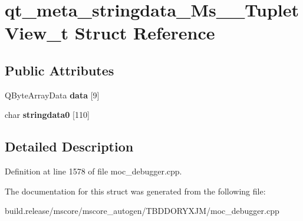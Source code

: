 \hypertarget{structqt__meta__stringdata___ms_____tuplet_view__t}{}\section{qt\+\_\+meta\+\_\+stringdata\+\_\+\+Ms\+\_\+\+\_\+\+Tuplet\+View\+\_\+t Struct Reference}
\label{structqt__meta__stringdata___ms_____tuplet_view__t}
\subsection*{Public Attributes}
\begin{DoxyCompactItemize}
\item 
\mbox{\label{structqt__meta__stringdata___ms_____tuplet_view__t_a9fe8747e81ca511d2bd26a7d454acd7c}} 
Q\+Byte\+Array\+Data {\bfseries data} \mbox{[}9\mbox{]}
\item 
\mbox{\label{structqt__meta__stringdata___ms_____tuplet_view__t_a79e1fede63194cd1b76359721edb19a3}} 
char {\bfseries stringdata0} \mbox{[}110\mbox{]}
\end{DoxyCompactItemize}


\subsection{Detailed Description}


Definition at line 1578 of file moc\+\_\+debugger.\+cpp.



The documentation for this struct was generated from the following file\+:\begin{DoxyCompactItemize}
\item 
build.\+release/mscore/mscore\+\_\+autogen/\+T\+B\+D\+D\+O\+R\+Y\+X\+J\+M/moc\+\_\+debugger.\+cpp\end{DoxyCompactItemize}
